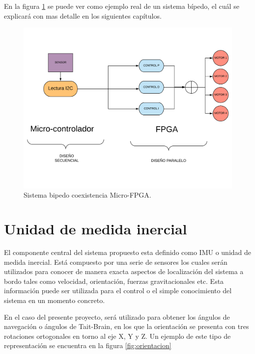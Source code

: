 En la figura \ref{fig:bipedo} se puede ver como ejemplo real de un sistema bípedo, el cuál se explicará con mas detalle en los siguientes capítulos.

\begin{center}
	\begin{figure}[H]
		\center
		\includegraphics[scale=0.5]{imagenes/EstadoArte/bipedo.pdf}
		\caption{Sistema bipedo coexistencia Micro-FPGA.}
		\label{fig:bipedo}
	\end{figure}
\end{center}
\section{Unidad de medida inercial}\label{sec:IMU}
El componente central del sistema propuesto esta definido como IMU o unidad de medida inercial. Está compuesto por una serie de sensores los cuales serán utilizados para conocer de manera exacta aspectos de localización del sistema a bordo tales como velocidad, orientación, fuerzas gravitacionales etc. \newline
Esta información puede ser utilizada para el control o el simple conocimiento del sistema en un momento concreto. \newline

En el caso del presente proyecto, será utilizado para obtener los ángulos de navegación o ángulos de Tait-Brain, en los que la orientación se presenta con tres rotaciones ortogonales en torno al eje X, Y y Z. Un ejemplo de este tipo de representación se encuentra en la figura \ref{fig:orientacion}\newline


